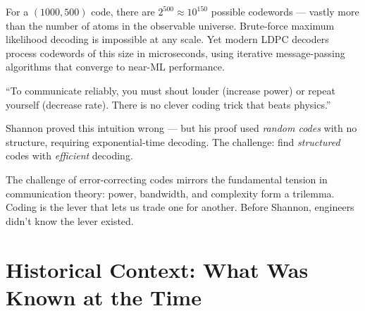 For a $(1000, 500)$ code, there are $2^{500} \approx 10^{150}$ possible codewords — vastly more than the number of atoms in the observable universe. Brute-force maximum likelihood decoding is impossible at any scale. Yet modern LDPC decoders process codewords of this size in microseconds, using iterative message-passing algorithms that converge to near-ML performance.

``To communicate reliably, you must shout louder (increase power) or repeat yourself (decrease rate). There is no clever coding trick that beats physics.''

Shannon proved this intuition wrong — but his proof used \emph{random codes} with no structure, requiring exponential-time decoding. The challenge: find \emph{structured} codes with \emph{efficient} decoding.

The challenge of error-correcting codes mirrors the fundamental tension in communication theory: power, bandwidth, and complexity form a trilemma. Coding is the lever that lets us trade one for another. Before Shannon, engineers didn't know the lever existed.

\section{Historical Context: What Was Known at the Time}
\label{sec:ec:context}


